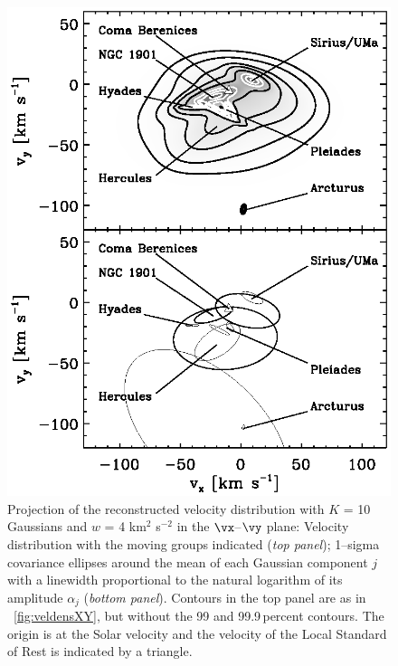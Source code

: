 \clearpage
\begin{figure}
\includegraphics[height=0.717\textheight]{annotated_veldist2.ps}
\caption{Projection of the reconstructed velocity distribution with $K$ = 10 Gaussians and $w$ = 4 km$^2$ s$^{-2}$ in the $\vx$--$\vy$ plane: Velocity distribution with the moving groups indicated (\emph{top panel}); 1--sigma covariance ellipses around the mean of each Gaussian component $j$ with a linewidth proportional to the natural logarithm of its amplitude $\alpha_j$ (\emph{bottom panel}). Contours in the top panel are as in \figurename~\ref{fig:veldensXY}, but without the 99 and 99.9\,percent contours. The origin is at the Solar velocity and the velocity of the Local Standard of Rest \citep{2005ApJ...629..268H} is indicated by a triangle.}%
\label{fig:annotated_veldist2}
\end{figure}




